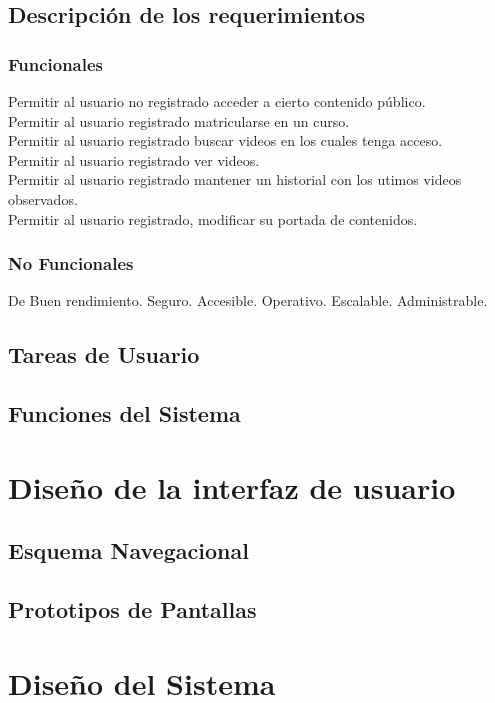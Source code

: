 \documentclass[12pt]{article}
\begin{document}
\subsection{Descripción de los requerimientos}
\subsubsection{Funcionales}
Permitir al usuario no registrado acceder a cierto contenido público.\\
Permitir al usuario registrado matricularse en un curso.\\
Permitir al usuario registrado buscar videos en los cuales tenga acceso.\\
Permitir al usuario registrado ver videos.\\
Permitir al usuario registrado mantener un historial con los utimos videos observados.\\ 
Permitir al usuario registrado, modificar su portada de contenidos.\\

\subsubsection{No Funcionales}
De Buen rendimiento.
Seguro.
Accesible.
Operativo.
Escalable.
Administrable.
\subsection{Tareas de Usuario}
\subsection{Funciones del Sistema}

\newpage
\section{Dise\~no de la interfaz de usuario}
\subsection{Esquema Navegacional}
\subsection{Prototipos de Pantallas}

\newpage
\section{Dise\~no del Sistema}
\end{document}
